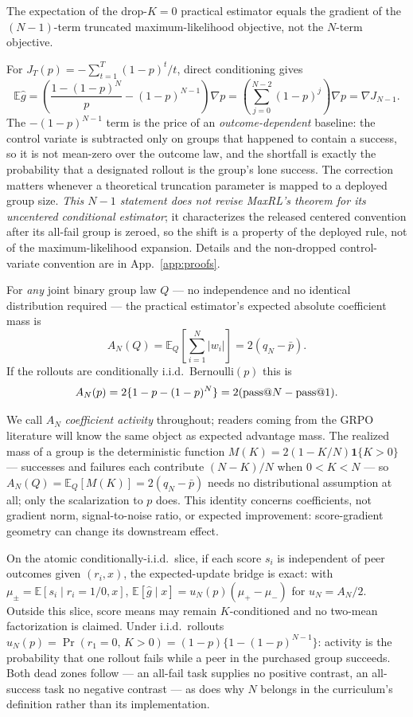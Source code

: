 \begin{lemma}
\label{lem:trunc}
The expectation of the drop-$K=0$ practical estimator equals the gradient of
the $(N-1)$-term truncated maximum-likelihood objective, not the $N$-term
objective.
\end{lemma}
\noindent
For $J_T(p)=-\sum_{t=1}^{T}(1-p)^t/t$, direct conditioning gives
\[
\mathbb E\hat g
=\left(\frac{1-(1-p)^N}{p}-(1-p)^{N-1}\right)\nabla p
=\left(\sum_{j=0}^{N-2}(1-p)^j\right)\nabla p
=\nabla J_{N-1}.
\]
The $-(1-p)^{N-1}$ term is the price of an \emph{outcome-dependent} baseline:
the control variate is subtracted only on groups that happened to contain a
success, so it is not mean-zero over the outcome law, and the shortfall is
exactly the probability that a designated rollout is the group's lone success.
The correction matters whenever a theoretical truncation parameter is mapped
to a deployed group size. \emph{This $N-1$ statement does not revise MaxRL's
theorem for its uncentered conditional estimator}; it characterizes the
released centered convention after its all-fail group is zeroed, so the shift
is a property of the deployed rule, not of the maximum-likelihood expansion.
Details and the non-dropped control-variate convention are in
App.~\ref{app:proofs}.

\begin{proposition}
\label{prop:mass}
For \emph{any} joint binary group law $Q$ --- no independence and no identical
distribution required --- the practical estimator's expected absolute
coefficient mass is
\[
A_N(Q)=\mathbb E_Q\!\left[\sum_{i=1}^{N}|w_i|\right]=2\left(q_N-\bar p\right).
\]
If the rollouts are conditionally i.i.d.\ Bernoulli$(p)$ this is
\[
A_N(p)=2\{1-p-(1-p)^N\}=2(\text{pass@}N-\text{pass@}1).
\]
\end{proposition}
\noindent
We call $A_N$ \emph{coefficient activity} throughout; readers coming from the
GRPO literature will know the same object as expected advantage mass. The
realized mass of a group is the deterministic function
$M(K)=2(1-K/N)\mathbf1\{K>0\}$ --- successes and failures each contribute
$(N-K)/N$ when $0<K<N$ --- so $A_N(Q)=\mathbb E_Q[M(K)]=2(q_N-\bar p)$ needs no
distributional assumption at all; only the scalarization to $p$ does. This
identity concerns coefficients, not gradient norm, signal-to-noise ratio, or
expected improvement: score-gradient geometry can change its downstream
effect.

On the atomic conditionally-i.i.d.\ slice, if each score $s_i$ is independent
of peer outcomes given $(r_i,x)$, the expected-update bridge is exact: with
$\mu_\pm=\mathbb E[s_i\mid r_i{=}1/0,x]$,
$\mathbb E[\hat g\mid x]=u_N(p)(\mu_+-\mu_-)$ for $u_N=A_N/2$. Outside this
slice, score means may remain $K$-conditioned and no two-mean factorization is
claimed. Under i.i.d.\ rollouts
$u_N(p)=\Pr(r_1{=}0,\,K>0)=(1-p)\{1-(1-p)^{N-1}\}$: activity is the
probability that one rollout fails while a peer in the purchased group
succeeds. Both dead zones follow --- an all-fail task supplies no positive
contrast, an all-success task no negative contrast --- as does why $N$ belongs
in the curriculum's definition rather than its implementation.

